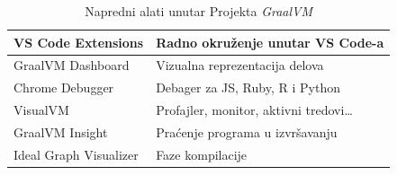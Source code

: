 \documentclass[a4paper]{article}
\begin{document}
\begin{table}
    \centering
    \begin{tabular}{|l|l|}
        \hline
        VS Code Extensions & Radno okruženje unutar VS Code-a\\
        \hline
        GraalVM Dashboard & Vizualna reprezentacija delova\\
        \hline
        Chrome Debugger & Debager za JS, Ruby, R i Python\\
        \hline
        VisualVM & Profajler, monitor, aktivni tredovi\ldots\\
        \hline
        GraalVM Insight & Praćenje programa u izvršavanju\\
        \hline
        Ideal Graph Visualizer & Faze kompilacije\\
        \hline
    \end{tabular}
    \caption{Napredni alati unutar Projekta \emph{GraalVM}}
    \label{alati}
\end{table}
\end{document}
